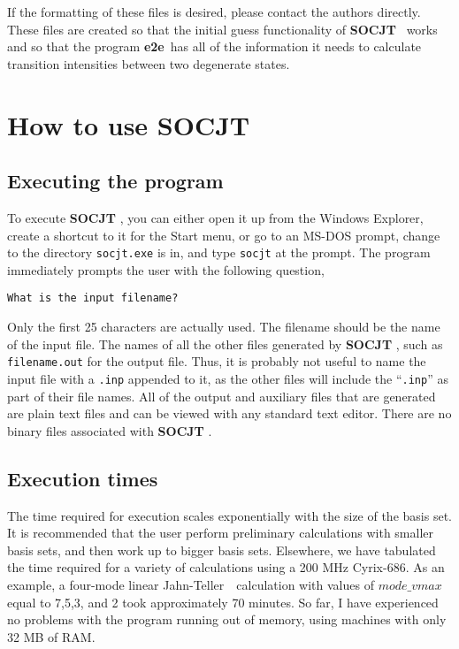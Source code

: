 \documentclass{article}
\newcommand{\JT}{Jahn-Teller\ }
\newcommand{\socjt}{{\bf SOCJT }}
\newcommand{\etoe}{{\bf e2e}}
\begin{document}
If the formatting of these files is desired, please contact the
authors directly. These files are created so that the initial guess
functionality of \socjt\ works and so that the program \etoe\ has all
of the information it needs to calculate transition intensities
between two degenerate states.

\section{How to use SOCJT} \label{section:howto}

\subsection{Executing the program}
To execute \socjt , you can either open it up from the Windows
Explorer, create a shortcut to it for the Start menu, or go to an
MS-DOS prompt, change to the directory {\tt socjt.exe} is in, and type
{\tt socjt} at the prompt. The program immediately prompts the user
with the following question,
\begin{verbatim}
What is the input filename?
\end{verbatim}
Only the first 25 characters are actually used. The
filename should be the name of the input file. The names of all the
other files generated by \socjt , such as {\tt filename.out} for the
output file. Thus, it is probably not useful to name the input file
with a {\tt .inp} appended to it, as the other files will include the
``{\tt .inp}'' as part of their file names. All of the output and
auxiliary files that are generated are plain text files and can be
viewed with any standard text editor. There are no binary files
associated with \socjt .

\subsection{Execution times}
The time required for execution scales exponentially with the size of
the basis set. It is recommended that the user perform preliminary
calculations with smaller basis sets, and then work up to bigger basis
sets. Elsewhere,\cite{tab11} we have tabulated the time required for a
variety of calculations using a 200 MHz Cyrix-686. As an example, a
four-mode linear \JT\ calculation with values of $mode\_vmax$ equal to
7,5,3, and 2 took approximately 70 minutes. So far, I have experienced
no problems with the program running out of memory, using machines
with only 32 MB of RAM.
\end{document}

